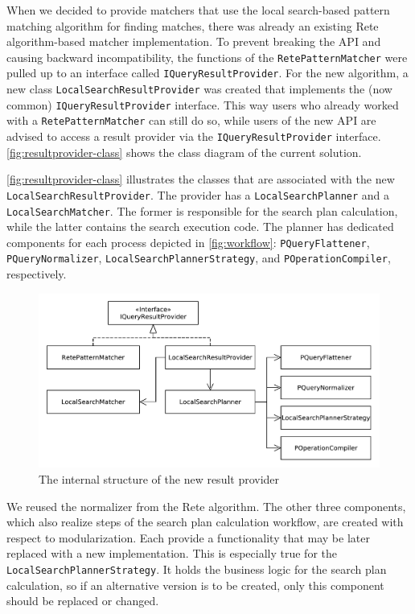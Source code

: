 When we decided to provide matchers that use the local search-based pattern matching algorithm for finding matches, there was already an existing Rete algorithm-based matcher implementation. To prevent breaking the API and causing backward incompatibility, the functions of the \texttt{RetePatternMatcher} were pulled up to an interface called \texttt{IQueryResultProvider}. For the new algorithm, a new class \texttt{LocalSearchResultProvider} was created that implements the (now common) \texttt{IQueryResultProvider} interface. This way users who already worked with a \texttt{RetePatternMatcher} can still do so, while users of the new API are advised to access a result provider via the \texttt{IQueryResultProvider} interface. \autoref{fig:resultprovider-class} shows the class diagram of the current solution.

\autoref{fig:resultprovider-class} illustrates the classes that are associated with the new \texttt{LocalSearchResultProvider}. The provider has a \texttt{LocalSearchPlanner} and a \texttt{LocalSearchMatcher}. The former is responsible for the search plan calculation, while the latter contains the search execution code. The planner has dedicated components for each process depicted in \autoref{fig:workflow}: \texttt{PQueryFlattener}, \texttt{PQueryNormalizer}, \texttt{LocalSearchPlannerStrategy}, and \texttt{POperationCompiler}, respectively.

\begin{figure}[!htp]
	\centering
	\includegraphics[width=\textwidth]{figures/pdfs/matcher-class-diagram.pdf}
	\caption{The internal structure of the new result provider}
	\label{fig:resultprovider-class}
\end{figure}

We reused the normalizer from the Rete algorithm. The other three components, which also realize steps of the search plan calculation workflow, are created with respect to modularization. Each provide a functionality that may be later replaced with a new implementation. This is especially true for the \texttt{LocalSearchPlannerStrategy}. It holds the business logic for the search plan calculation, so if an alternative version is to be created, only this component should be replaced or changed. 



